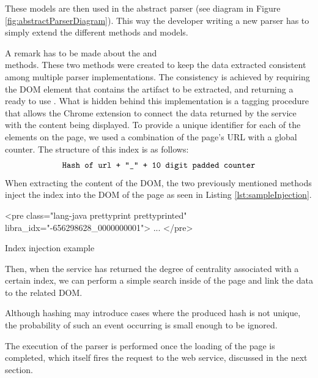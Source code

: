 These models are then used in the abstract parser (see diagram in Figure \ref{fig:abstractParserDiagram}). This way the developer writing a new parser has to simply extend the different methods and models. 

A remark has to be made about the  and \\ methods. These two methods were created to keep the data extracted consistent among multiple parser implementations. The consistency is achieved by requiring the DOM element that contains the artifact to be extracted, and returning a ready to use . What is hidden behind this implementation is a tagging procedure that allows the Chrome extension to connect the data returned by the service with the content being displayed. To provide a unique identifier for each of the elements on the page, we used a combination of the page's URL with a global counter. The structure of this index is as follows:
\[
\text{\texttt{Hash of url + "\_" + 10 digit padded counter}}
\]
When extracting the content of the DOM, the two previously mentioned methods inject the index into the DOM of the page as seen in Listing \ref{lst:sampleInjection}.
\begin{listing}[H]
\centering
\begin{htmlcode}
<pre class="lang-java prettyprint prettyprinted" libra_idx="-656298628_0000000001">
    ...
</pre>
\end{htmlcode}
\caption{Index injection example}
\label{lst:sampleInjection}
\end{listing}

Then, when the service has returned the degree of centrality associated with a certain index, we can perform a simple search inside of the page and link the data to the related DOM. 

Although hashing may introduce cases where the produced hash is not unique, the probability of such an event occurring is small enough to be ignored.


The execution of the parser is performed once the loading of the page is completed, which itself fires the request to the web service, discussed in the next section.


